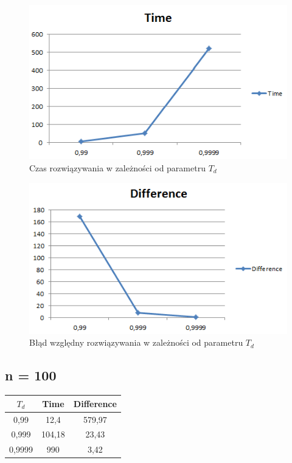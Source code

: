 \documentclass[wide,a4paper,titlepage,12pt] {article}
\begin{document}
\begin{figure}[htbp]
  \begin{center}
         \includegraphics[scale=0.8]{time50.PNG}
         \caption{Czas rozwiązywania w zależności od parametru $T_d$}
  \end{center}
\end{figure}

\begin{figure}[htbp]
  \begin{center}
         \includegraphics[scale=0.8]{diff50.PNG}
         \caption{Błąd względny rozwiązywania w zależności od parametru $T_d$}
  \end{center}
\end{figure}

\newpage
\subsection{n = 100}
\begin{center}
    \begin{tabular}{|c|c|c|}
      \hline
       $T_{d}$ & Time & Difference \\ \hline
       0,99 & 12,4 & 579,97 \\ \hline
       0,999 & 104,18 & 23,43 \\ \hline
       0,9999 & 990 & 3,42 \\ \hline
  \end{tabular}
\end{center}
\end{document}
